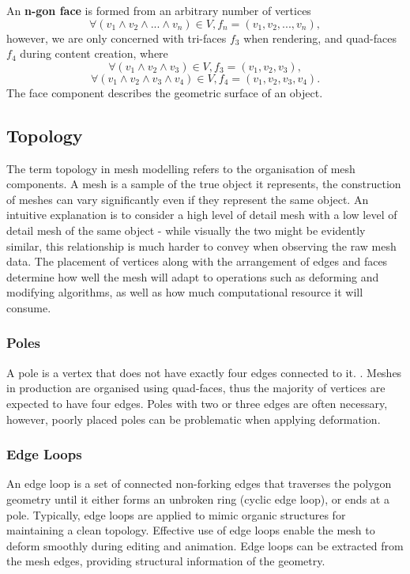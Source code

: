 \documentclass[ %
author={Dillon Keith Diep},
supervisor={Dr. Carl Henrik Ek},
degree={MEng},
title={ART-CG:},
subtitle={Assisted Real-time Content Generation of 3D Hair by Learning Manifolds},
type={Research},
year={2017} ]{dissertation}
\begin{document}
An \textbf{n-gon face} is formed from an arbitrary number of vertices 
$$\forall (v_1 \land v_2 \land ... \land v_n) \in V, f_n = (v_1, v_2,..., v_n),$$ 
however, we are only concerned with tri-faces $f_3$ when rendering, and quad-faces $f_4$ during content creation, where
$$\forall (v_1 \land v_2 \land v_3) \in V, f_3 = (v_1, v_2, v_3),$$
$$\forall (v_1 \land v_2 \land v_3 \land v_4) \in V, f_4 = (v_1, v_2, v_3, v_4).$$
The face component describes the geometric surface of an object.

\subsection{Topology}
The term topology in mesh modelling refers to the organisation of mesh components. \cite[p.91]{blenderstudio} A mesh is a sample of the true object it represents, the construction of meshes can vary significantly even if they represent the same object. An intuitive explanation is to consider a high level of detail mesh with a low level of detail mesh of the same object - while visually the two might be evidently similar, this relationship is much harder to convey when observing the raw mesh data. The placement of vertices along with the arrangement of edges and faces determine how well the mesh will adapt to operations such as deforming and modifying algorithms, as well as how much computational resource it will consume.

\subsubsection{Poles}
A pole is a vertex that does not have exactly four edges connected to it. \cite[p.92]{blenderstudio}. Meshes in production are organised using quad-faces, thus the majority of vertices are expected to have four edges. Poles with two or three edges are often necessary, however, poorly placed poles can be problematic when applying deformation.

\subsubsection{Edge Loops}
An edge loop is a set of connected non-forking edges that traverses the polygon geometry until it either forms an unbroken ring (cyclic edge loop), or ends at a pole. \cite[p.93]{blenderstudio} Typically, edge loops are applied to mimic organic structures for maintaining a clean topology. \cite[pp.10-12]{edgeloops} Effective use of edge loops enable the mesh to deform smoothly during editing and animation. Edge loops can be extracted from the mesh edges, providing structural information of the geometry.
\end{document}
